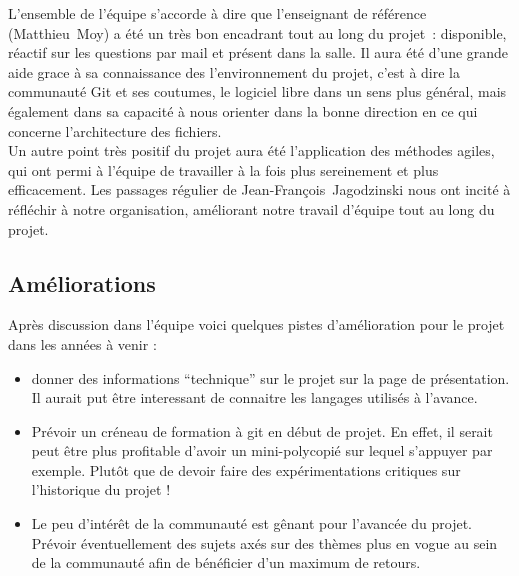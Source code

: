 \documentclass[11pt]{article}
\begin{document}
L'ensemble de l'équipe s'accorde à dire que l'enseignant de
  référence (Matthieu~Moy) a été un très bon encadrant tout au long du
  projet~: disponible, réactif sur les questions par mail et présent
  dans la salle. Il aura été d'une grande aide grace à sa connaissance
  des l'environnement du projet, c'est à dire la communauté Git et ses
  coutumes, le logiciel libre dans un sens plus général, mais
  également dans sa capacité à nous orienter dans la bonne direction
  en ce qui concerne l'architecture des fichiers.
  \\
  Un autre point très positif du projet aura été l'application des
  méthodes agiles, qui ont permi à l'équipe de travailler à la fois plus
  sereinement et plus efficacement. Les passages régulier de
  Jean-François~Jagodzinski nous ont incité à réfléchir à notre
  organisation, améliorant notre travail d'équipe tout au long du projet.

\subsection*{Améliorations}

Après discussion dans l'équipe voici quelques pistes d'amélioration pour le projet dans les années à venir : 

  \begin{itemize}
  \item donner des informations ``technique'' sur le projet sur la page de présentation. Il aurait put être interessant de connaitre les langages utilisés à l'avance.
  \item Prévoir un créneau de formation à git en début de projet. En effet, il serait peut être plus profitable d'avoir un mini-polycopié sur lequel s'appuyer par exemple. Plutôt que de devoir faire des expérimentations critiques sur l'historique du projet !
  \item Le peu d'intérêt de la communauté est gênant pour l'avancée du projet. Prévoir éventuellement des sujets axés sur des thèmes plus en vogue au sein de la communauté afin de bénéficier d'un maximum de retours.
  \end{itemize}
\end{document}
